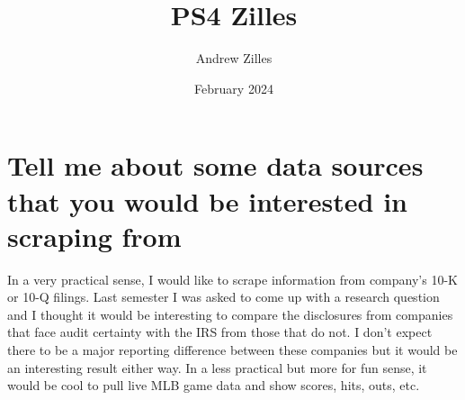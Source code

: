 \documentclass{article}
\title{PS4 Zilles}
\author{Andrew Zilles}
\date{February 2024}
\begin{document}
\maketitle

\section{Tell me about some data sources that you would be interested in scraping from}
In a very practical sense, I would like to scrape information from company's 10-K or 10-Q filings. Last semester I was asked to come up with a research question and I thought it would be interesting to compare the disclosures from companies that face audit certainty with the IRS from those that do not. I don't expect there to be a major reporting difference between these companies but it would be an interesting result either way. In a less practical but more for fun sense, it would be cool to pull live MLB game data and show scores, hits, outs, etc.
\end{document}
